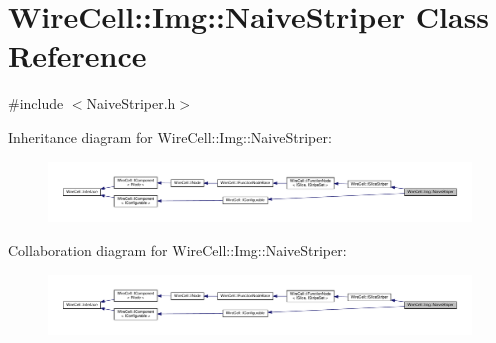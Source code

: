 \hypertarget{class_wire_cell_1_1_img_1_1_naive_striper}{}\section{Wire\+Cell\+:\+:Img\+:\+:Naive\+Striper Class Reference}
\label{class_wire_cell_1_1_img_1_1_naive_striper}


{\ttfamily \#include $<$Naive\+Striper.\+h$>$}



Inheritance diagram for Wire\+Cell\+:\+:Img\+:\+:Naive\+Striper\+:
\nopagebreak
\begin{figure}[H]
\begin{center}
\leavevmode
\includegraphics[width=350pt]{class_wire_cell_1_1_img_1_1_naive_striper__inherit__graph}
\end{center}
\end{figure}


Collaboration diagram for Wire\+Cell\+:\+:Img\+:\+:Naive\+Striper\+:
\nopagebreak
\begin{figure}[H]
\begin{center}
\leavevmode
\includegraphics[width=350pt]{class_wire_cell_1_1_img_1_1_naive_striper__coll__graph}
\end{center}
\end{figure}
